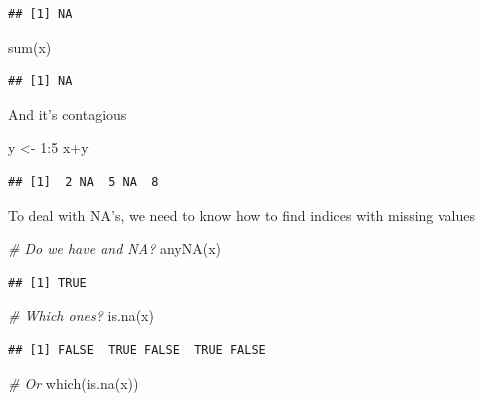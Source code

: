 \documentclass[
]{book}
\newenvironment{Shaded}{\begin{snugshade}}{\end{snugshade}}
\newcommand{\CommentTok}[1]{\textcolor[rgb]{0.56,0.35,0.01}{\textit{#1}}}
\newcommand{\DecValTok}[1]{\textcolor[rgb]{0.00,0.00,0.81}{#1}}
\newcommand{\FunctionTok}[1]{\textcolor[rgb]{0.00,0.00,0.00}{#1}}
\newcommand{\NormalTok}[1]{#1}
\newcommand{\OtherTok}[1]{\textcolor[rgb]{0.56,0.35,0.01}{#1}}
\newcommand{\SpecialCharTok}[1]{\textcolor[rgb]{0.00,0.00,0.00}{#1}}
\begin{document}
\begin{verbatim}
## [1] NA
\end{verbatim}

\begin{Shaded}
\begin{Highlighting}[]
\FunctionTok{sum}\NormalTok{(x)}
\end{Highlighting}
\end{Shaded}

\begin{verbatim}
## [1] NA
\end{verbatim}

And it's contagious

\begin{Shaded}
\begin{Highlighting}[]
\NormalTok{y }\OtherTok{\textless{}{-}} \DecValTok{1}\SpecialCharTok{:}\DecValTok{5}
\NormalTok{x}\SpecialCharTok{+}\NormalTok{y}
\end{Highlighting}
\end{Shaded}

\begin{verbatim}
## [1]  2 NA  5 NA  8
\end{verbatim}

To deal with NA's, we need to know how to find indices with missing values

\begin{Shaded}
\begin{Highlighting}[]
\CommentTok{\# Do we have and NA?}
\FunctionTok{anyNA}\NormalTok{(x)}
\end{Highlighting}
\end{Shaded}

\begin{verbatim}
## [1] TRUE
\end{verbatim}

\begin{Shaded}
\begin{Highlighting}[]
\CommentTok{\# Which ones?}
\FunctionTok{is.na}\NormalTok{(x)}
\end{Highlighting}
\end{Shaded}

\begin{verbatim}
## [1] FALSE  TRUE FALSE  TRUE FALSE
\end{verbatim}

\begin{Shaded}
\begin{Highlighting}[]
\CommentTok{\# Or}
\FunctionTok{which}\NormalTok{(}\FunctionTok{is.na}\NormalTok{(x))}
\end{Highlighting}
\end{Shaded}
\end{document}
